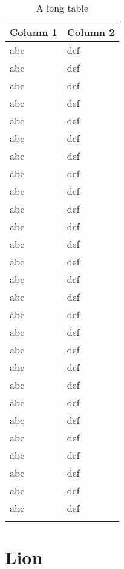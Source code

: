 \begin{longtable}[]{@{}ll@{}}
  \toprule
  Column 1 & Column 2 \\
  \midrule
  \endhead
  abc      & def      \\
  abc      & def      \\
  abc      & def      \\
  abc      & def      \\
  abc      & def      \\
  abc      & def      \\
  abc      & def      \\
  abc      & def      \\
  abc      & def      \\
  abc      & def      \\
  abc      & def      \\
  abc      & def      \\
  abc      & def      \\
  abc      & def      \\
  abc      & def      \\
  abc      & def      \\
  abc      & def      \\
  abc      & def      \\
  abc      & def      \\
  abc      & def      \\
  abc      & def      \\
  abc      & def      \\
  abc      & def      \\
  abc      & def      \\
  abc      & def      \\
  abc      & def      \\
  abc      & def      \\
  \bottomrule
  \caption{A long table}\label{tab:table2}
\end{longtable}

\section{Lion}\label{subsec:Lion}
\lipsum[2-4]
